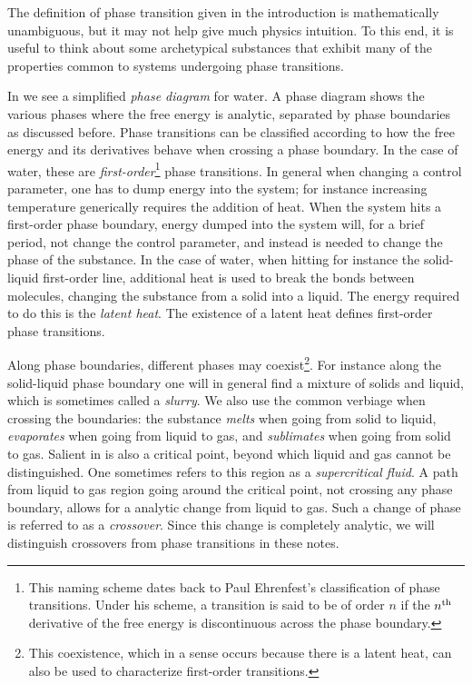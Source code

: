 The definition of phase transition given in the introduction is mathematically
unambiguous, but it may not help give much physics intuition. To this end, it is
useful to think about some archetypical substances that exhibit many of the
properties common to systems undergoing phase transitions.

In  we see a simplified {\it phase diagram} for water. A phase diagram shows the various phases where
the free energy is analytic, separated by phase boundaries as discussed before.
Phase transitions can be classified according to how the free energy and its
derivatives behave when crossing a phase boundary. In the case of water, these
are {\it first-order}\footnote{This naming scheme dates back to Paul Ehrenfest's
classification of phase transitions. Under his scheme, a transition is said to
be of order $n$ if the $n{}^{\rm th}$ derivative of the free energy is discontinuous
across the phase boundary.} phase transitions.
In general when changing a control parameter, one has to dump energy into the
system; for instance increasing temperature generically requires the addition of
heat. When the system hits a first-order phase boundary, energy dumped into the
system will, for a brief period, not change the control parameter, and instead
is needed to change the phase of the substance. In the case of water, when
hitting for instance the solid-liquid first-order line, additional heat is used
to break the bonds between molecules, changing the substance from a solid into a
liquid. The energy required to do this is the {\it latent heat}. The existence of a latent heat defines first-order phase transitions.

Along phase boundaries, different phases may coexist\footnote{This
coexistence, which in a sense occurs because there is a latent heat,
can also be used to characterize first-order transitions.}. For instance along the
solid-liquid phase boundary one will in general find a mixture of solids and
liquid, which is sometimes called a {\it slurry}. We also use
the common verbiage when crossing the boundaries: the substance {\it
melts} when going from solid to liquid, {\it
evaporates} when going
from liquid to gas, and {\it sublimates} when going from solid
to gas. Salient in  is also a critical point, beyond
which liquid and gas cannot be distinguished. One sometimes refers to this
region as a {\it supercritical fluid}. A path from
liquid to gas region going around the critical point, not crossing any phase
boundary, allows for a analytic change from liquid to gas. Such a change of
phase is referred to as a {\it crossover}. Since this change is
completely analytic, we will distinguish crossovers from phase transitions in
these notes. 

